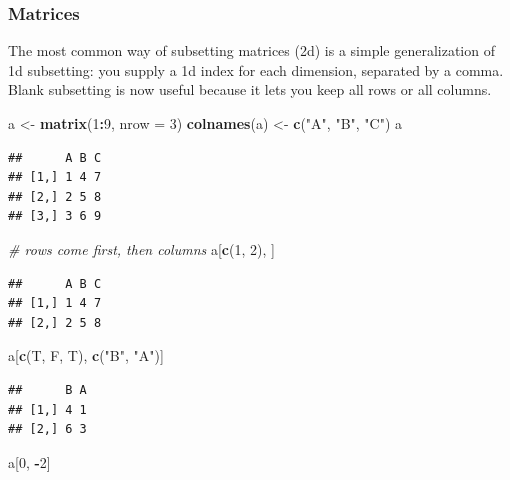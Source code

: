 \documentclass[
]{book}
\newenvironment{Shaded}{\begin{snugshade}}{\end{snugshade}}
\newcommand{\AttributeTok}[1]{\textcolor[rgb]{0.13,0.29,0.53}{#1}}
\newcommand{\CommentTok}[1]{\textcolor[rgb]{0.56,0.35,0.01}{\textit{#1}}}
\newcommand{\DecValTok}[1]{\textcolor[rgb]{0.00,0.00,0.81}{#1}}
\newcommand{\FunctionTok}[1]{\textcolor[rgb]{0.13,0.29,0.53}{\textbf{#1}}}
\newcommand{\NormalTok}[1]{#1}
\newcommand{\OtherTok}[1]{\textcolor[rgb]{0.56,0.35,0.01}{#1}}
\newcommand{\SpecialCharTok}[1]{\textcolor[rgb]{0.81,0.36,0.00}{\textbf{#1}}}
\newcommand{\StringTok}[1]{\textcolor[rgb]{0.31,0.60,0.02}{#1}}
\begin{document}
\subsubsection{Matrices}\label{matrices-1}

The most common way of subsetting matrices (2d) is a simple generalization of 1d subsetting: you supply a 1d index for each dimension, separated by a comma. Blank subsetting is now useful because it lets you keep all rows or all columns.

\begin{Shaded}
\begin{Highlighting}[]
\NormalTok{a }\OtherTok{\textless{}{-}} \FunctionTok{matrix}\NormalTok{(}\DecValTok{1}\SpecialCharTok{:}\DecValTok{9}\NormalTok{, }\AttributeTok{nrow =} \DecValTok{3}\NormalTok{)}
\FunctionTok{colnames}\NormalTok{(a) }\OtherTok{\textless{}{-}} \FunctionTok{c}\NormalTok{(}\StringTok{"A"}\NormalTok{, }\StringTok{"B"}\NormalTok{, }\StringTok{"C"}\NormalTok{)}
\NormalTok{a}
\end{Highlighting}
\end{Shaded}

\begin{verbatim}
##      A B C
## [1,] 1 4 7
## [2,] 2 5 8
## [3,] 3 6 9
\end{verbatim}

\begin{Shaded}
\begin{Highlighting}[]
\CommentTok{\# rows come first, then columns}
\NormalTok{a[}\FunctionTok{c}\NormalTok{(}\DecValTok{1}\NormalTok{, }\DecValTok{2}\NormalTok{), ]}
\end{Highlighting}
\end{Shaded}

\begin{verbatim}
##      A B C
## [1,] 1 4 7
## [2,] 2 5 8
\end{verbatim}

\begin{Shaded}
\begin{Highlighting}[]
\NormalTok{a[}\FunctionTok{c}\NormalTok{(T, F, T), }\FunctionTok{c}\NormalTok{(}\StringTok{"B"}\NormalTok{, }\StringTok{"A"}\NormalTok{)]}
\end{Highlighting}
\end{Shaded}

\begin{verbatim}
##      B A
## [1,] 4 1
## [2,] 6 3
\end{verbatim}

\begin{Shaded}
\begin{Highlighting}[]
\NormalTok{a[}\DecValTok{0}\NormalTok{, }\SpecialCharTok{{-}}\DecValTok{2}\NormalTok{]}
\end{Highlighting}
\end{Shaded}
\end{document}
